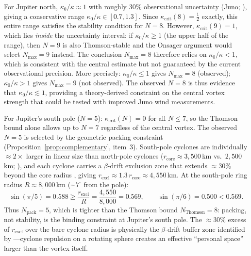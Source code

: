 \noindent
For Jupiter north, $\kappa_0/\kappa \approx 1$ with roughly 30\%
observational uncertainty (Juno; \citealt{Adriani2018}), giving a
conservative range $\kappa_0/\kappa \in [0.7, 1.3]$.  Since
$\kappa_{\mathrm{crit}}(8) = \tfrac{1}{2}$ exactly, this entire
range satisfies the stability condition for $N = 8$.  However,
$\kappa_{\mathrm{crit}}(9) = 1$, which lies \emph{inside} the
uncertainty interval: if $\kappa_0/\kappa \ge 1$ (the upper half
of the range), then $N = 9$ is also Thomson-stable and the Onsager
argument would select $N_{\max} = 9$ instead.  The conclusion
$N_{\max} = 8$ therefore relies on $\kappa_0/\kappa < 1$, which is
consistent with the central estimate but not guaranteed by the
current observational precision.  More precisely:
$\kappa_0/\kappa \le 1$ gives $N_{\max} = 8$ (observed);
$\kappa_0/\kappa > 1$ gives $N_{\max} = 9$ (not observed).  The
observed $N = 8$ is thus evidence that $\kappa_0/\kappa \lesssim 1$,
providing a theory-derived constraint on the central vortex
strength that could be tested with improved Juno wind
measurements.

\label{sec:n-selection}%
For Jupiter's south pole ($N = 5$): $\kappa_{\mathrm{crit}}(N) = 0$
for all $N \le 7$, so the Thomson bound alone allows up to $N = 7$
regardless of the central vortex.  The observed $N = 5$ is selected
by the geometric packing constraint
(Proposition~\ref{prop:complementary}, item~3).
South-pole cyclones are individually $\approx 2\times$ larger in
linear size than north-pole cyclones ($r_{\mathrm{core}} \approx
3{,}500$\,km vs.\ $2{,}500$\,km; \citealt{Adriani2018}), and each
cyclone carries a $\beta$-drift exclusion zone that extends $\approx
30\%$ beyond the core radius \citep{Gavriel2021}, giving
$r_{\mathrm{excl}} \approx 1.3\,r_{\mathrm{core}} \approx 4{,}550$\,km.
At the south-pole ring radius $R \approx 8{,}000$\,km
($\sim\!7^{\circ}$ from the pole):
\[
  \sin(\pi/5) = 0.588 \ge \frac{r_{\mathrm{excl}}}{R}
  = \frac{4{,}550}{8{,}000} = 0.569,
  \qquad
  \sin(\pi/6) = 0.500 < 0.569.
\]
Thus $N_{\mathrm{pack}} = 5$, which is tighter than the Thomson bound
$N_{\mathrm{Thomson}} = 8$: packing, not stability, is the binding
constraint at Jupiter's south pole.  The $\approx 30\%$ excess of
$r_{\mathrm{excl}}$ over the bare cyclone radius is physically the
$\beta$-drift buffer zone identified by \citet{Gavriel2021}---cyclone
repulsion on a rotating sphere creates an effective ``personal space''
larger than the vortex itself.



